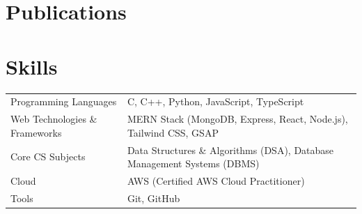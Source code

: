 \section{Publications}
\begin{refsection}
\nocite{*}
\printbibliography[heading=none]
\end{refsection}

\section{Skills}
\begin{tabularx}{\linewidth}{@{}l X@{}}
Programming Languages & \normalsize{C, C++, Python, JavaScript, TypeScript}\\
Web Technologies \& Frameworks & \normalsize{MERN Stack (MongoDB, Express, React, Node.js), Tailwind CSS, GSAP}\\  
Core CS Subjects & \normalsize{Data Structures \& Algorithms (DSA), Database Management Systems (DBMS)}\\
Cloud & \normalsize{AWS (Certified AWS Cloud Practitioner)}\\
Tools & \normalsize{Git, GitHub}\\
\end{tabularx}
